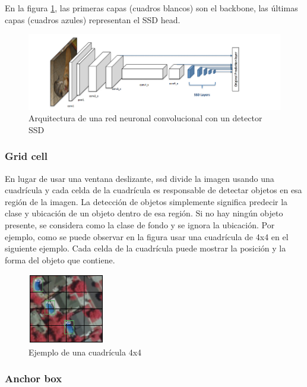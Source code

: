 En la figura \ref{fig:ssd-structure}, las primeras capas (cuadros blancos) son el backbone, las últimas capas (cuadros azules) representan el SSD head.

\begin{figure}[ht]
\centering
\includegraphics[width=1\textwidth]{img/chapters/estado-del-arte/ssd-structure.png}
\caption{\label{fig:ssd-structure}Arquitectura de una red neuronal convolucional con un detector SSD}
\end{figure}

\subsubsection*{Grid cell}
\label{subsubsec:grid-cell-ssd}

En lugar de usar una ventana deslizante, \gls{ssd} divide la imagen usando una cuadrícula y cada celda de la cuadrícula es responsable de detectar objetos en esa región de la imagen. La detección de objetos simplemente significa predecir la clase y ubicación de un objeto dentro de esa región. Si no hay ningún objeto presente, se considera como la clase de fondo y se ignora la ubicación. Por ejemplo, como se puede observar en la figura usar una cuadrícula de 4x4 en el siguiente ejemplo. Cada celda de la cuadrícula puede mostrar la posición y la forma del objeto que contiene.

\begin{figure}[ht]
\centering
\includegraphics[width=0.3\textwidth]{img/chapters/estado-del-arte/gridcell.png}
\caption{\label{fig:ejemplo-grid-cell}Ejemplo de una cuadrícula 4x4}
\end{figure}

\subsubsection*{Anchor box}
\label{subsubsec:anchor-box-ssd}


